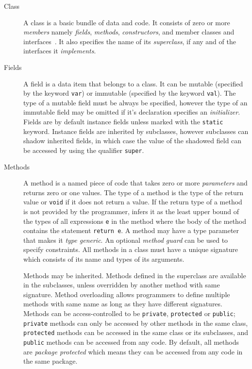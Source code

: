 \begin{description}

\item[Class] A class is a basic bundle of data and code. It consists of zero or
more \emph{members} namely \emph{fields}, \emph{methods}, \emph{constructors},
and member classes and interfaces~\cite{x10intro}. It also specifies the name of its
\emph{superclass}, if any and of the interfaces it \emph{implements}.  

\item[Fields] A field is a data item that belongs to a class. It can be mutable
(specified by the keyword  \texttt{var}) or immutable (specified by the keyword
\texttt{val}). The type of a mutable field must be always be specified, however
the type of an immutable field may be omitted if it's declaration specifies an
\emph{initializer}. Fields are by default instance fields unless marked with the
\texttt{static} keyword. Instance fields are inherited by subclasses, however
subclasses can shadow inherited fields, in which case the value of the shadowed
field can be accessed by using the qualifier \texttt{super}.


\item[Methods] A method is a named piece of code that takes zero or more
\emph{parameters} and returns zero or one values. The type of a method is
the type of the return value or \texttt{void} if it does not return a value.
If the return type of a method is not provided by the programmer, \xten infers
it as the least upper bound of the types of all expressions \texttt{e} in the
method where the body of the method contains the statement \texttt{return e}.
A method may have a type parameter that makes it \emph{type generic}. An
optional \emph{method guard} can be used to specify constraints. All methods in
a class must have a unique signature which consists of its name and types of its
arguments.     

Methods may be inherited. Methods defined in the superclass are available in the
subclasses, unless overridden by another method with same signature. Method
overloading allows programmers to define multiple methods with same name as long
as they have different signatures. Methods can be access-controlled to be
\texttt{private}, \texttt{protected} or \texttt{public}; \texttt{private}
methods can only be accessed by other methods in the same class,
\texttt{protected} methods can be accessed in the same class or its subclasses,
and \texttt{public} methods can be accessed from any code. By default, all
methods are \emph{package protected} which means they can be accessed from any
code in the same package.


\end{description}
